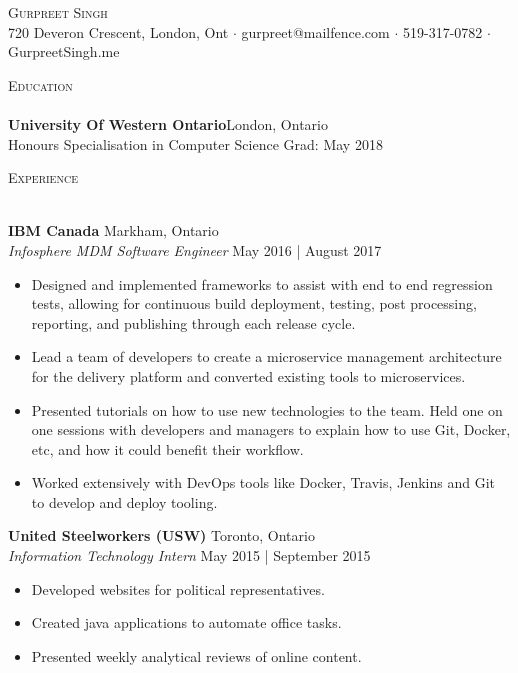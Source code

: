 \documentclass[a4paper]{article}
\newcommand{\lineunder} {
    \vspace*{-8pt} \\
    \hspace*{-18pt} \hrulefill \\
}
\newcommand{\header} [1] {
    {\hspace*{-18pt}\vspace*{6pt} \textsc{#1}}
    \vspace*{-6pt} \lineunder
}
\begin{document}
\vspace*{-40pt}

\vspace*{-10pt}
\begin{center}
	{\Huge \scshape {Gurpreet Singh}}\\
	720 Deveron Crescent, London, Ont $\cdot$ gurpreet@mailfence.com $\cdot$ 519-317-0782 $\cdot$ GurpreetSingh.me\\
\end{center}

\vspace*{2mm}

\header{Education}
\textbf{University Of Western Ontario}\hfill London, Ontario\\
Honours Specialisation in Computer Science \hfill Grad: May 2018\\
\vspace{2mm}

\vspace*{2mm}

\header{Experience}
\vspace{1mm}

\textbf{IBM Canada} \hfill Markham, Ontario\\
\textit{Infosphere MDM Software Engineer} \hfill May 2016 | August 2017\\
\vspace{-1mm}
\begin{itemize} \itemsep 1pt
	\item Designed and implemented frameworks to assist with end to end regression tests, allowing for continuous build deployment, testing, post processing, reporting, and publishing through each release cycle.
	\item Lead a team of developers to create a microservice management architecture for the delivery platform and converted existing tools to microservices.
	\item Presented tutorials on how to use new technologies to the team. Held one on one sessions with developers and managers to explain how to use Git, Docker, etc, and how it could benefit their workflow.
	\item Worked extensively with DevOps tools like Docker, Travis, Jenkins and Git to develop and deploy tooling.
\end{itemize}

\textbf{United Steelworkers (USW)} \hfill Toronto, Ontario\\
\textit{Information Technology Intern} \hfill May 2015 | September 2015\\
\vspace{-1mm}
\begin{itemize} \itemsep 1pt
	\item Developed websites for political representatives.
	\item Created java applications to automate office tasks.
	\item Presented weekly analytical reviews of online content.
\end{itemize}
\end{document}
